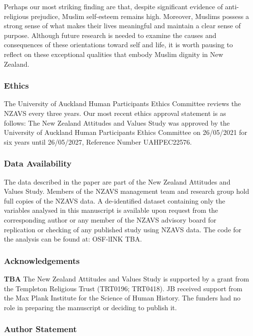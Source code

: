 \documentclass[
  single column]{article}
\begin{document}
Perhaps our most striking finding are that, despite significant evidence
of anti-religious prejudice, Muslim self-esteem remains high. Moreover,
Muslims possess a strong sense of what makes their lives meaningful and
maintain a clear sense of purpose. Although future research is needed to
examine the causes and consequences of these orientations toward self
and life, it is worth pausing to reflect on these exceptional qualities
that embody Muslim dignity in New Zealand.

\newpage{}

\subsubsection{Ethics}\label{ethics}

The University of Auckland Human Participants Ethics Committee reviews
the NZAVS every three years. Our most recent ethics approval statement
is as follows: The New Zealand Attitudes and Values Study was approved
by the University of Auckland Human Participants Ethics Committee on
26/05/2021 for six years until 26/05/2027, Reference Number UAHPEC22576.

\subsubsection{Data Availability}\label{data-availability}

The data described in the paper are part of the New Zealand Attitudes
and Values Study. Members of the NZAVS management team and research
group hold full copies of the NZAVS data. A de-identified dataset
containing only the variables analysed in this manuscript is available
upon request from the corresponding author or any member of the NZAVS
advisory board for replication or checking of any published study using
NZAVS data. The code for the analysis can be found at: OSF-lINK TBA.

\subsubsection{Acknowledgements}\label{acknowledgements}

\textbf{TBA} The New Zealand Attitudes and Values Study is supported by
a grant from the Templeton Religious Trust (TRT0196; TRT0418). JB
received support from the Max Plank Institute for the Science of Human
History. The funders had no role in preparing the manuscript or deciding
to publish it.

\subsubsection{Author Statement}\label{author-statement}
\end{document}
